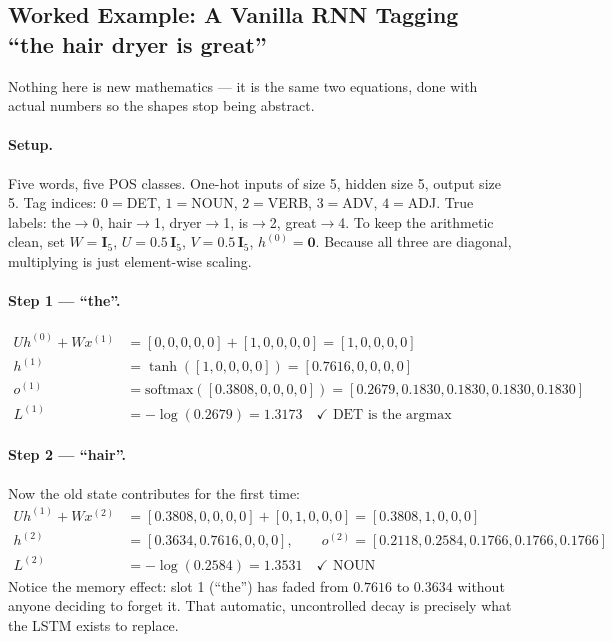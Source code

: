 \documentclass[11pt,a4paper]{article}
\begin{document}
\subsection{Worked Example: A Vanilla RNN Tagging ``the hair dryer is great''}

Nothing here is new mathematics --- it is the same two equations, done with actual numbers so
the shapes stop being abstract.

\paragraph{Setup.} Five words, five POS classes. One-hot inputs of size 5, hidden size 5,
output size 5. Tag indices: $0=$DET, $1=$NOUN, $2=$VERB, $3=$ADV, $4=$ADJ. True labels:
the$\to$0, hair$\to$1, dryer$\to$1, is$\to$2, great$\to$4. To keep the arithmetic clean, set
$W = \mathbf{I}_5$, $U = 0.5\,\mathbf{I}_5$, $V = 0.5\,\mathbf{I}_5$, $h^{(0)} = \mathbf{0}$.
Because all three are diagonal, multiplying is just element-wise scaling.

\paragraph{Step 1 --- ``the''.}
\begin{align*}
U h^{(0)} + W x^{(1)} &= [0,0,0,0,0] + [1,0,0,0,0] = [1,0,0,0,0] \\
h^{(1)} &= \tanh([1,0,0,0,0]) = [0.7616,0,0,0,0] \\
o^{(1)} &= \mathrm{softmax}([0.3808,0,0,0,0]) = [0.2679, 0.1830, 0.1830, 0.1830, 0.1830] \\
L^{(1)} &= -\log(0.2679) = 1.3173 \quad \checkmark \text{ DET is the argmax}
\end{align*}

\paragraph{Step 2 --- ``hair''.} Now the old state contributes for the first time:
\begin{align*}
U h^{(1)} + W x^{(2)} &= [0.3808,0,0,0,0] + [0,1,0,0,0] = [0.3808,1,0,0,0] \\
h^{(2)} &= [0.3634, 0.7616, 0, 0, 0], \qquad
o^{(2)} = [0.2118, 0.2584, 0.1766, 0.1766, 0.1766] \\
L^{(2)} &= -\log(0.2584) = 1.3531 \quad \checkmark \text{ NOUN}
\end{align*}
Notice the memory effect: slot 1 (``the'') has faded from $0.7616$ to $0.3634$ without anyone
deciding to forget it. That automatic, uncontrolled decay is precisely what the LSTM exists
to replace.
\end{document}
